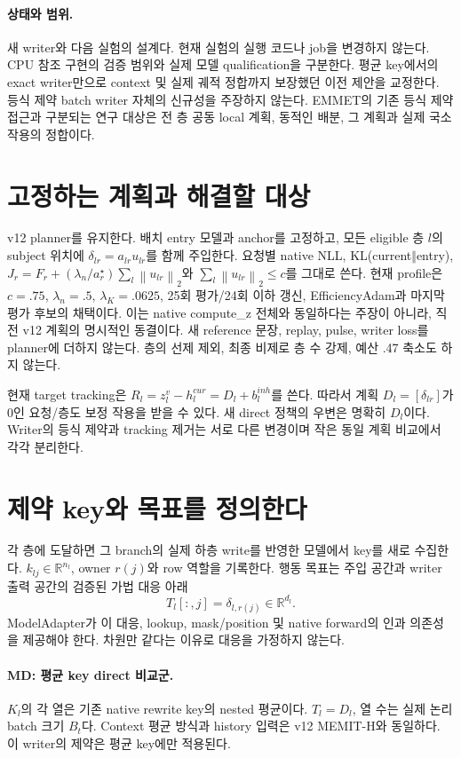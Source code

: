 \documentclass[11pt]{article}
\newcommand{\norm}[1]{\left\lVert #1\right\rVert}
\begin{document}
\paragraph{상태와 범위.}
새 writer와 다음 실험의 설계다. 현재 실험의 실행 코드나 job을 변경하지 않는다.
CPU 참조 구현의 검증 범위와 실제 모델 qualification을 구분한다.
평균 key에서의 exact writer만으로 context 및 실제 궤적 정합까지 보장했던 이전
제안을 교정한다. 등식 제약 batch writer 자체의 신규성을 주장하지 않는다.
EMMET의 기존 등식 제약 접근과 구분되는 연구 대상은 전 층 공동 local 계획,
동적인 배분, 그 계획과 실제 국소 작용의 정합이다.

\section{고정하는 계획과 해결할 대상}
v12 planner를 유지한다. 배치 entry 모델과 anchor를 고정하고, 모든 eligible
층 $l$의 subject 위치에 $\delta_{lr}=a_{lr}u_{lr}$를 함께 주입한다.
요청별 native NLL, KL(current$\Vert$entry),
$J_r=F_r+(\lambda_n/a_r^\star)\sum_l\norm{u_{lr}}_2$와
$\sum_l\norm{u_{lr}}_2\le c$를 그대로 쓴다. 현재 profile은 $c=.75$,
$\lambda_n=.5$, $\lambda_K=.0625$, 25회 평가/24회 이하 갱신,
EfficiencyAdam과 마지막 평가 후보의 채택이다. 이는 native compute\_z 전체와
동일하다는 주장이 아니라, 직전 v12 계획의 명시적인 동결이다.
새 reference 문장, replay, pulse, writer loss를 planner에 더하지 않는다.
층의 선제 제외, 최종 비제로 층 수 강제, 예산 .47 축소도 하지 않는다.

현재 target tracking은 $R_l=z_l^v-h_l^{cur}=D_l+b_l^{inh}$를 쓴다.
따라서 계획 $D_l=[\delta_{lr}]$가 0인 요청/층도 보정 작용을 받을 수 있다.
새 direct 정책의 우변은 명확히 $D_l$이다. Writer의 등식 제약과 tracking
제거는 서로 다른 변경이며 작은 동일 계획 비교에서 각각 분리한다.

\section{제약 key와 목표를 정의한다}
각 층에 도달하면 그 branch의 실제 하층 write를 반영한 모델에서 key를 새로
수집한다. $k_{lj}\in\mathbb R^{n_l}$, owner $r(j)$와 row 역할을 기록한다.
행동 목표는 주입 공간과 writer 출력 공간의 검증된 가법 대응 아래
\[
 T_l[:,j]=\delta_{l,r(j)}\in\mathbb R^{d_l}.
\]
ModelAdapter가 이 대응, lookup, mask/position 및 native forward의 인과
의존성을 제공해야 한다. 차원만 같다는 이유로 대응을 가정하지 않는다.

\paragraph{MD: 평균 key direct 비교군.}
$K_l$의 각 열은 기존 native rewrite key의 nested 평균이다. $T_l=D_l$,
열 수는 실제 논리 batch 크기 $B_t$다. Context 평균 방식과 history 입력은
v12 MEMIT-H와 동일하다. 이 writer의 제약은 평균 key에만 적용된다.
\end{document}
